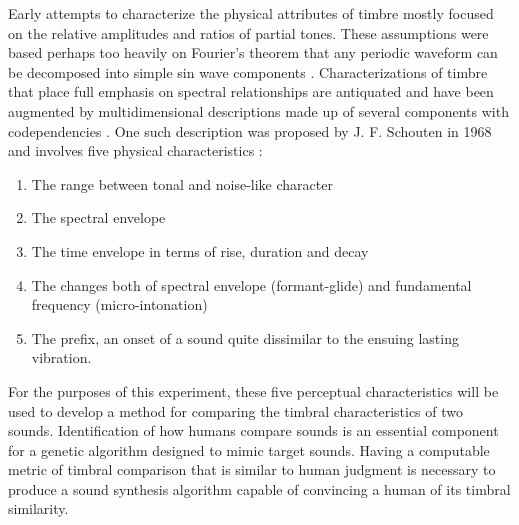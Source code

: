 \documentclass[12pt]{article}
\begin{document}
Early attempts to characterize the physical attributes of timbre mostly focused on the relative amplitudes and ratios of partial tones. These assumptions were based perhaps too heavily on Fourier's theorem that any periodic waveform can be decomposed into simple sin wave components \citep{helmholtz1857physiological, helmholtz1954sensations}. Characterizations of timbre that place full emphasis on spectral relationships are antiquated and have been augmented by multidimensional descriptions made up of several components with codependencies \citep{erickson1975sound}. One such description was proposed by J. F. Schouten in 1968 and involves five physical characteristics \citep{schouten1968perception, erickson1975sound}:
\begin{enumerate}
\item
The range between tonal and noise-like character
\item
The spectral envelope
\item
The time envelope in terms of rise, duration and decay
\item
The changes both of spectral envelope (formant-glide) and fundamental frequency (micro-intonation)
\item
The prefix, an onset of a sound quite dissimilar to the ensuing lasting vibration.
\end{enumerate}

For the purposes of this experiment, these five perceptual characteristics will be used to develop a method for comparing the timbral characteristics of two sounds. Identification of how humans compare sounds is an essential component for a genetic algorithm designed to mimic target sounds. Having a computable metric of timbral comparison that is similar to human judgment is necessary to produce a sound synthesis algorithm capable of convincing a human of its timbral similarity.
\end{document}
